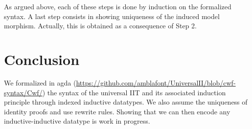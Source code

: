 As argued above, each of these steps is done by induction on the formalized syntax. 
A last step consists in showing uniqueness of the induced model morphism. Actually, this is obtained as a consequence of Step 2.




\section{Conclusion}
We formalized in agda
(\url{https://github.com/amblafont/UniversalII/blob/cwf-syntax/Cwf/}) the syntax
of the universal IIT and its associated induction principle through indexed
inductive datatypes. We also assume the uniqueness of identity proofs and use
rewrite rules. Showing that we can then encode any inductive-inductive datatype
is work in progress.
